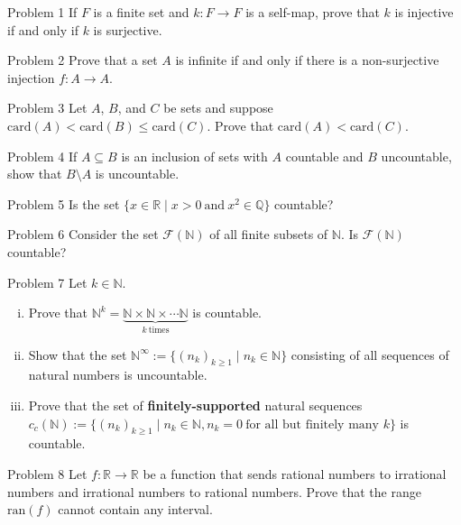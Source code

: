\documentclass[8pt]{extarticle}
\title{}
\author{Avinash Iyer}
\date{}
\begin{document}
{
  \begin{problem}{Problem 1}
    If $F$ is a finite set and $k:F\rightarrow F$ is a self-map, prove that $k$ is injective if and only if $k$ is surjective.
  \end{problem}
  \begin{problem}{Problem 2}
    Prove that a set $A$ is infinite if and only if there is a non-surjective injection $f:A\rightarrow A$.
  \end{problem}
  \begin{problem}{Problem 3}
    Let $A$, $B$, and $C$ be sets and suppose $\textrm{card}(A) < \textrm{card}(B) \leq \textrm{card}(C)$. Prove that $\textrm{card}(A) < \textrm{card}(C)$.
  \end{problem}
  \begin{problem}{Problem 4}
    If $A\subseteq B$ is an inclusion of sets with $A$ countable and $B$ uncountable, show that $B\setminus A$ is uncountable.
  \end{problem}
  \begin{problem}{Problem 5}
    Is the set $\{x\in\mathbb{R} \mid x>0~\textrm{and}~x^2\in\mathbb{Q}\}$ countable?
  \end{problem}
  \begin{problem}{Problem 6}
    Consider the set $\mathcal{F}(\mathbb{N})$ of all finite subsets of $\mathbb{N}$. Is $\mathcal{F}(\mathbb{N})$ countable?
  \end{problem}
  \begin{problem}{Problem 7}
    Let $k\in\mathbb{N}$.
    \begin{enumerate}[(i)]
      \item Prove that $\mathbb{N}^k = \underbrace{\mathbb{N}\times\mathbb{N}\times\cdots\mathbb{N}}_{k~\textrm{times}}$ is countable.
      \item Show that the set $\mathbb{N}^{\infty} := \{(n_k)_{k\geq 1}\mid n_k\in \mathbb{N}\}$ consisting of all sequences of natural numbers is uncountable.
      \item Prove that the set of \textbf{finitely-supported} natural sequences $c_c(\mathbb{N}) := \{(n_k)_{k\geq 1} \mid n_k\in\mathbb{N}, n_k=0~\text{for all but finitely many }k\}$ is countable.
    \end{enumerate}
  \end{problem}
  \begin{problem}{Problem 8}
    Let $f:\mathbb{R} \rightarrow \mathbb{R}$ be a function that sends rational numbers to irrational numbers and irrational numbers to rational numbers. Prove that the range $\textrm{ran}(f)$ cannot contain any interval.

\end{problem}}
\end{document}

